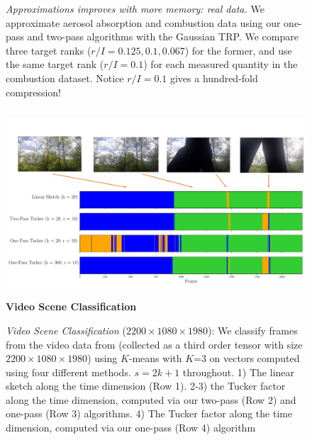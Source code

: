 \begin{figure}
	\caption{\textit{Approximations improves with more memory: real data.}
		We approximate aerosol absorption and combustion data
		using our one-pass and two-pass algorithms with the Gaussian TRP.
		We compare three target ranks ($r/I = 0.125,0.1,0.067$) for the former,
		and use the same target rank ($r/I = 0.1$) for each measured quantity in
		the combustion dataset.
		Notice $r/I = 0.1$ gives a hundred-fold compression!
	}\label{fig:climate}
\end{figure}

\begin{figure}[h!]
	\includegraphics[height=7cm]{figure/video_classification_result.pdf} \\
	\centering
	\textbf{Video Scene Classification}
	\caption{\textit{Video Scene Classification}
		($2200 \times 1080 \times 1980$):
		We classify frames from the video data
		from \cite{malik2018low} (collected as a third order tensor with size $2200 \times 1080 \times 1980$) using $K$-means with $K$=3 on vectors computed using four different methods. $s = 2k+1$ throughout.
		1) The linear sketch along the time dimension (Row 1).
		2-3) the Tucker factor along the time dimension,
		computed via our two-pass (Row 2) and one-pass (Row 3) algorithms.
		4) The Tucker factor along the time dimension,
		computed via our one-pass (Row 4) algorithm
		}\label{fig:video}
\end{figure}

